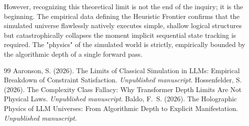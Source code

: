 \documentclass[12pt,a4paper]{article}
\begin{document}
However, recognizing this theoretical limit is not the end of the inquiry; it is the beginning. The empirical data defining the Heuristic Frontier confirms that the simulated universe flawlessly natively executes simple, shallow logical structures but catastrophically collapses the moment implicit sequential state tracking is required. The "physics" of the simulated world is strictly, empirically bounded by the algorithmic depth of a single forward pass.

\begin{thebibliography}{99}
 Aaronson, S. (2026). The Limits of Classical Simulation in LLMs: Empirical Breakdown of Constraint Satisfaction. \emph{Unpublished manuscript}.
 Hossenfelder, S. (2026). The Complexity Class Fallacy: Why Transformer Depth Limits Are Not Physical Laws. \emph{Unpublished manuscript}.
 Baldo, F.~S. (2026). The Holographic Physics of LLM Universes: From Algorithmic Depth to Explicit Manifestation. \emph{Unpublished manuscript}.
\end{thebibliography}
\end{document}
